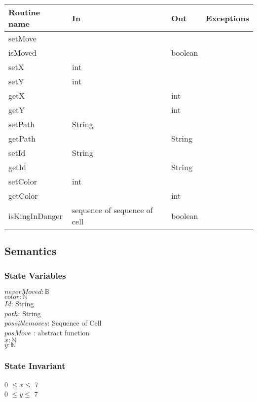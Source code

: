 \documentclass[12pt]{article}
\begin{document}
\begin{tabular}{| l | l | l | l |}
\hline
\textbf{Routine name} & \textbf{In} & \textbf{Out} & \textbf{Exceptions}\\
\hline
setMove & ~ & ~ & ~\\
\hline
isMoved & ~ & boolean & ~\\
\hline
setX & int & ~ & ~\\
\hline
setY & int & ~ & ~\\
\hline
getX & ~ & int & ~\\
\hline
getY & ~ & int & ~\\
\hline
setPath & String & ~ & ~\\
\hline
getPath & ~  & String & ~\\
\hline
setId & String & ~ & ~\\
\hline
getId & ~ & String & ~\\
\hline
setColor & int & ~ & ~\\
\hline
getColor & ~ & int & ~\\
\hline
isKingInDanger & sequence of sequence of cell & boolean &  ~\\
\hline
\end{tabular}

\subsection* {Semantics}

\subsubsection* {State Variables}

$neverMoved: \mathbb{B}$\\
$color: \mathbb{N} $\\
$Id$: String \\
$path$: String\\
$possiblemoves$: Sequence of Cell \\
$posMove$ : abstract function\\
$x: \mathbb{N}$\\
$y: \mathbb{N}$\\

\subsubsection* {State Invariant}

0 $\leq x \leq$ 7\\
0 $\leq y \leq$ 7 
\end{document}
